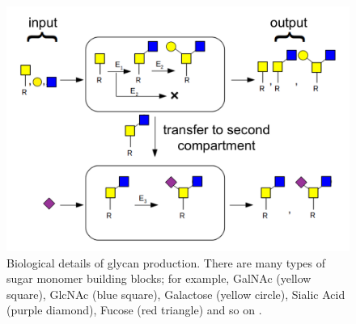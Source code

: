 \begin{figure}[t]
  \centering
  \begin{minipage}{0.54\linewidth}
    \includegraphics[width=0.9\linewidth]{gfig1.png}    
  \end{minipage}
  \begin{minipage}{0.44\linewidth}
    \caption{Biological details of glycan production. There are many types of sugar monomer building blocks; %
      for example, GalNAc (yellow square), GlcNAc (blue square), Galactose (yellow circle), Sialic Acid (purple diamond), Fucose (red triangle) and so on \cite{Varki2017}.}
    \label{fig:glycan-rule}
  \end{minipage}
\end{figure}


